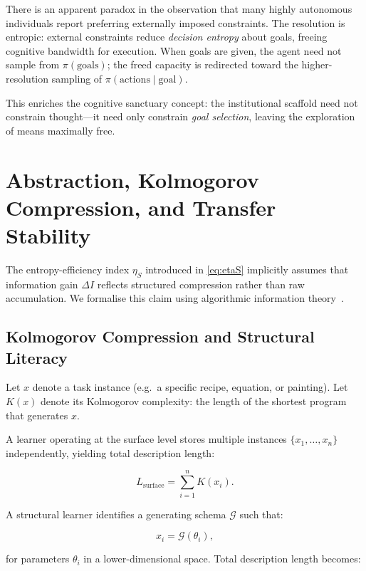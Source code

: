 \documentclass[12pt,a4paper]{article}
\theoremstyle{definition}
\begin{document}
There is an apparent paradox in the observation that many highly autonomous
individuals report preferring externally imposed constraints.  The resolution
is entropic: external constraints reduce \emph{decision entropy} about goals,
freeing cognitive bandwidth for execution.  When goals are given, the agent
need not sample from $\pi(\text{goals})$; the freed capacity is redirected
toward the higher-resolution sampling of $\pi(\text{actions} \mid \text{goal})$.

This enriches the cognitive sanctuary concept: the institutional scaffold need
not constrain thought---it need only constrain \emph{goal selection}, leaving
the exploration of means maximally free.

\section{Abstraction, Kolmogorov Compression, and Transfer Stability}
\label{sec:kolmogorov}

The entropy-efficiency index $\eta_S$ introduced in \eqref{eq:etaS}
implicitly assumes that information gain $\Delta I$ reflects structured
compression rather than raw accumulation.  We formalise this claim using
algorithmic information theory~\citep{kolmogorov1965,chaitin1969}.

\subsection{Kolmogorov Compression and Structural Literacy}

Let $x$ denote a task instance (e.g.\ a specific recipe, equation, or painting).
Let $K(x)$ denote its Kolmogorov complexity: the length of the shortest
program that generates $x$.

A learner operating at the surface level stores multiple instances
$\{x_1,\dots,x_n\}$ independently, yielding total description length:

\begin{equation}
  L_{\mathrm{surface}} = \sum_{i=1}^n K(x_i).
\end{equation}

A structural learner identifies a generating schema $\mathcal{G}$ such that:

\begin{equation}
  x_i = \mathcal{G}(\theta_i),
\end{equation}

for parameters $\theta_i$ in a lower-dimensional space.  Total description
length becomes:
\end{document}
